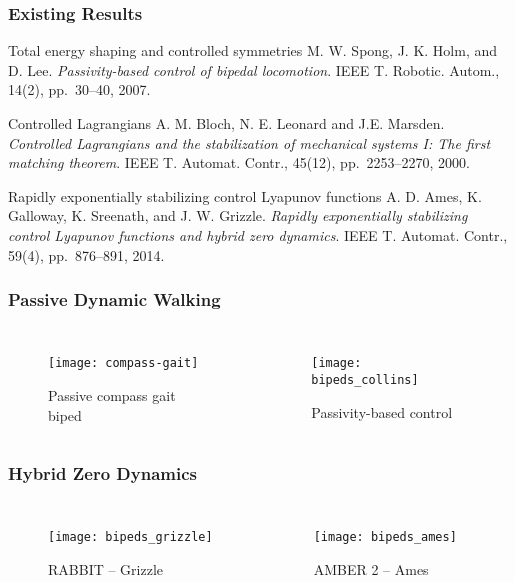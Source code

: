 \begin{frame}[t]
  \frametitle{Existing Results}
  \begin{block}{Total energy shaping and controlled symmetries}
    \small
    M. W. Spong, J. K. Holm, and D. Lee. {\em Passivity-based control of
      bipedal locomotion}. IEEE T. Robotic. Autom., 14(2), pp.~30--40,
    2007.
  \end{block}
  \begin{block}{Controlled Lagrangians}
    \small
    A. M. Bloch, N. E. Leonard and J.E. Marsden. {\em Controlled Lagrangians
      and the stabilization of mechanical systems I: The first matching
      theorem}. IEEE T. Automat. Contr., 45(12), pp.~2253--2270, 2000.
  \end{block}
  \begin{block}{Rapidly exponentially stabilizing control Lyapunov functions}
    \small
    A. D. Ames, K. Galloway, K. Sreenath, and J. W. Grizzle. {\em Rapidly
    exponentially stabilizing control Lyapunov functions and hybrid zero
    dynamics}. IEEE T. Automat. Contr., 59(4), pp.~876--891, 2014.
  \end{block}
\end{frame}

\newcommand{\fgap}{\vspace{-.8em}}

\begin{frame}[t]
  \frametitle{Passive Dynamic Walking}
  \vspace{-1em}
  \begin{columns}    
    \begin{figure}
      \centering
      \texttt{[image: compass-gait]}
      \fgap
      \caption{Passive compass gait biped}
    \end{figure}
    
    \begin{figure}
      \centering
      \texttt{[image: bipeds\_collins]}
      \fgap
      \caption{Passivity-based control}
    \end{figure}
  \end{columns}
\end{frame}

\begin{frame}[t]
  \frametitle{Hybrid Zero Dynamics}
  \vspace{-1em}
  \begin{columns}
    \begin{figure}
      \centering
      \texttt{[image: bipeds\_grizzle]}
      \fgap
      \caption{RABBIT -- Grizzle}
    \end{figure}
    
    \begin{figure}
      \centering
      \texttt{[image: bipeds\_ames]}
      \fgap
      \caption{AMBER 2 -- Ames}
    \end{figure}
  \end{columns}
\end{frame}
